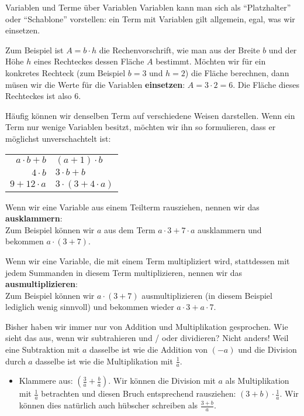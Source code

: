 \documentclass[../../main.tex]{subfiles}
\begin{document}
	\begin{nutshell}{Variablen und Terme über Variablen}
		Variablen kann man sich als \enquote{Platzhalter} oder \enquote{Schablone} vorstellen: ein Term mit Variablen gilt allgemein, egal, was wir einsetzen.

		Zum Beispiel ist $A = b\cdot h$ die Rechenvorschrift, wie man aus der Breite $b$ und der Höhe $h$ eines Rechteckes dessen Fläche $A$ bestimmt.
		Möchten wir für ein konkretes Rechteck (zum Beispiel $b=3$ und $h=2$) die Fläche berechnen, dann müsen wir die Werte für die Variablen \textbf{einsetzen}:
		$A = 3\cdot 2 = 6$. Die Fläche dieses Rechteckes ist also $6$.

		Häufig können wir denselben Term auf verschiedene Weisen darstellen. Wenn ein Term nur wenige Variablen besitzt, möchten wir ihn so formulieren,
		dass er möglichst unverschachtelt ist:
		\begin{center}
			\begin{tabular}{r@{ statt }l}
				$a\cdot b + b$ & $(a+1)\cdot b$\\
				$4\cdot b$ & $3\cdot b + b$\\
				$9+12\cdot a$ & $3\cdot (3 + 4\cdot a)$
			\end{tabular}
		\end{center}

		Wenn wir eine Variable aus einem Teilterm rausziehen, nennen wir das \textbf{ausklammern}:\\
		Zum Beispiel können wir $a$ aus dem Term $a\cdot 3+7\cdot a$ ausklammern und bekommen $a\cdot(3+7)$.

		Wenn wir eine Variable, die mit einem Term multipliziert wird, stattdessen mit jedem Summanden in diesem Term multiplizieren, nennen wir das \textbf{ausmultiplizieren}:\\
		Zum Beispiel können wir $a\cdot (3+7)$ ausmultiplizieren (in diesem Beispiel lediglich wenig sinnvoll) und bekommen wieder $a\cdot 3+ a\cdot 7$.
	\end{nutshell}

	Bisher haben wir immer nur von Addition und Multiplikation gesprochen. Wie sieht das aus, wenn wir subtrahieren und / oder dividieren?
	Nicht anders! Weil eine Subtraktion mit $a$ dasselbe ist wie die Addition von $(-a)$ und die Division durch $a$ dasselbe ist wie die Multiplikation mit $\frac{1}{a}$.
	\begin{example}{}
		\begin{itemize}
			\item Klammere aus: $\left(\frac{3}{a}+\frac{b}{a}\right)$. Wir können die Division mit $a$ als Multiplikation mit $\frac{1}{a}$ betrachten und diesen Bruch entsprechend rausziehen:
			$(3+b)\cdot \frac{1}{a}$. Wir können dies natürlich auch hübscher schreiben als $\frac{3+b}{a}$.
		\end{itemize}
	\end{example}
\end{document}
